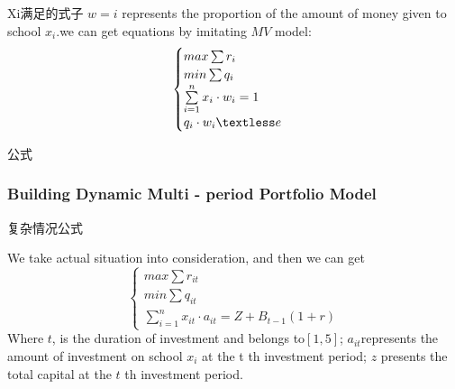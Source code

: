 Xi满足的式子
$w=i$ represents the proportion of the amount of money given to school $x_i$.we can get equations by imitating $MV$ model:
$$\begin{cases}
max\sum r_i\\
min\sum q_i\\
\sum\limits_{i=1}^{n}x_i\cdot w_i=1\\
q_i\cdot w_i\textless e
\end{cases}$$

公式

\subsubsection{Building Dynamic Multi - period Portfolio Model}

复杂情况公式

We take actual situation into consideration, and then we can get 
$$
\begin{cases}
max\sum r_{it}\\
min\sum q_{it}\\
\sum\limits_{i=1}^{n}x_{it}\cdot a_{it}=Z+B_{t-1}(1+r)
\end{cases}
$$
Where $t$, is the duration of investment and belongs to$[1,5]$; 
$a_{it}$represents the amount of investment on school $x_i$ at the t th investment period; $z$ presents the total capital at the $t$ th investment period.
